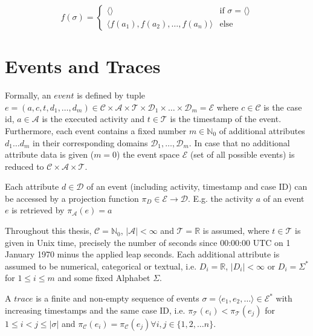 	\[
	f(\sigma) =
	\begin{cases}
	\langle \rangle & \text{if $\sigma = \langle \rangle$} \\
	\langle f(a_1), f(a_2), \dots, f(a_n)\rangle & \text{else} 
	\end{cases}
	\]


\section{Events and Traces}

\begin{definition}
Formally, an  $event$ is defined by tuple $e = (a,c,t,d_1,\dots, d_m) \in \mathcal{C} \times \mathcal{A}  \times \mathcal{T} \times \mathcal{D}_1 \times \dots \times \mathcal{D}_m =  \mathcal{E}$ where  $c \in \mathcal{C} $ is the case id, $a \in \mathcal{A}$ is the executed activity and $t \in \mathcal{T}$ is the timestamp of the event.
Furthermore, each event contains a fixed number $m \in \mathbb{N}_0$ of additional attributes $d_1 \dots d_m$ in their corresponding domains $\mathcal{D}_1, \dots , \mathcal{D}_m$.
In case that no additional attribute data is given ($m = 0$) the event space $\mathcal{E}$ (set of all possible events) is reduced to $\mathcal{C} \times \mathcal{A}  \times \mathcal{T}$.
\end{definition}

Each attribute $d \in \mathcal{D}$ of an event (including activity, timestamp and case ID) can be accessed by a projection function $\pi_D \in \mathcal{E} \rightarrow \mathcal{D}$.
E.g. the activity $a$ of an event $e$ is retrieved by $\pi_\mathcal{A}(e) = a$

Throughout this thesis,  $\mathcal{C} = \mathbb{N}_0$, $|\mathcal{A}| < \infty$ and $ \mathcal{T} = \mathbb{R}$ is assumed, where $t \in \mathcal{T}$ is given in Unix time, precisely the number of seconds since 00:00:00 UTC on 1 January 1970 minus the applied leap seconds.
Each additional attribute is assumed to be numerical, categorical or textual, i.e. $D_i = \mathbb{R}$, $|D_i| < \infty$ or $D_i = \Sigma^\ast$  for $1 \leq i \leq m$ and some fixed Alphabet $\Sigma$.

\begin{definition}
	A $trace$ is a finite and non-empty sequence of events $\sigma = \langle e_1, e_2, \dots\rangle \in  \mathcal{E}^\ast$ with increasing timestamps and the same case ID, i.e. $\pi_\mathcal{T} (e_i) < \pi_\mathcal{T} (e_j) $ for $1 \leq i < j \leq |\sigma|$ and $\pi_\mathcal{C} (e_i) = \pi_\mathcal{C} (e_j) \forall i,j \in \{1, 2, \dots n\}$.
\end{definition}

